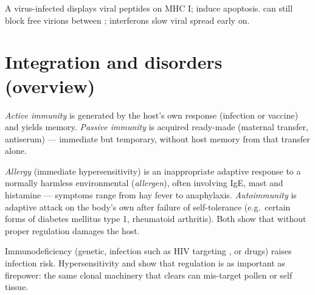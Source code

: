 \begin{example}\label{ex:g12:immunity:virus}
A virus-infected  displays viral peptides on MHC  I;  induce apoptosis.  can still block free virions
between ; interferons slow viral spread early on.
\end{example}

\section{Integration and disorders (overview)}

\begin{definition}
\label{def:g12:immunity:active-passive}
\emph{Active immunity} is generated by the
host's own response (infection or vaccine) and yields memory.
\emph{Passive immunity} is acquired ready-made
 (maternal transfer, antiserum) --- immediate but temporary,
without host memory from that transfer alone.
\end{definition}

\begin{definition}
\label{def:g12:immunity:allergy-auto}
\emph{Allergy} (immediate hypersensitivity) is an
inappropriate adaptive response to a normally harmless environmental
 (\emph{allergen}), often involving IgE, mast
 and histamine --- symptoms range from hay fever to anaphylaxis.
\emph{Autoimmunity} is adaptive attack on the body's
own  after failure of self-tolerance (e.g.\ certain forms of
diabetes mellitus type 1, rheumatoid arthritis). Both show that
 without proper regulation damages the host.
\end{definition}

\begin{proposition}
\label{prop:g12:immunity:disorders}
Immunodeficiency (genetic, infection such as HIV targeting , or drugs) raises infection risk. Hypersensitivity and
 show that regulation is as important as firepower: the same
clonal machinery that clears  can mis-target pollen or self
tissue.
\end{proposition}
\admitted

